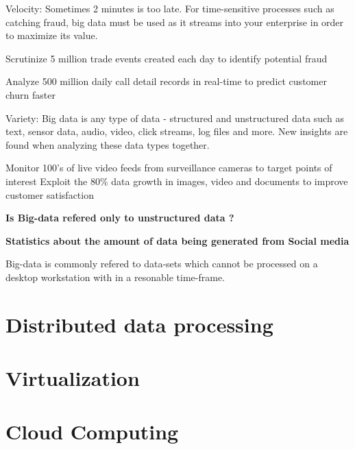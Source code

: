 \documentclass[12pt,a4paper]{report}
\begin{document}
Velocity: Sometimes 2 minutes is too late. For time-sensitive processes such as catching fraud,
big data must be used as it streams into your enterprise in order to maximize its value.

Scrutinize 5 million trade events created each day to identify potential fraud

Analyze 500 million daily call detail records in real-time to predict customer churn faster


Variety: Big data is any type of data - structured and unstructured data such as text,
sensor data, audio, video, click streams, log files and more. New insights are found when
analyzing these data types together.

Monitor 100’s of live video feeds from surveillance cameras to target points of interest
Exploit the 80\% data growth in images, video and documents to improve customer satisfaction






\cite{ibm:bigdata} 

{\bf Is Big-data refered only to unstructured data ?}


{\bf Statistics about the amount of data being generated from Social media}

Big-data is commonly refered to data-sets which cannot be processed on a
desktop workstation with in a resonable time-frame.

\section{Distributed data processing}

\section{Virtualization}

\section{Cloud Computing}
\end{document}
